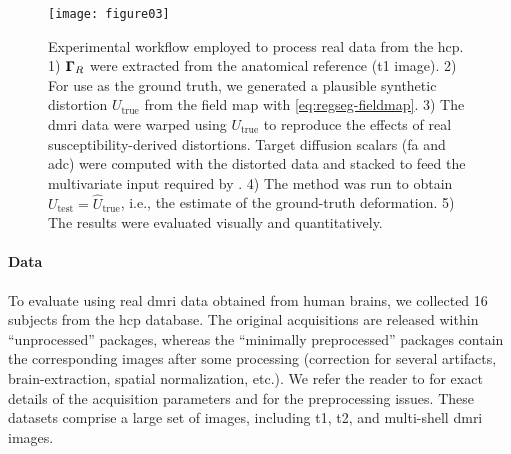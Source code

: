 \begin{figure*}
\texttt{[image: figure03]}
\caption{Experimental workflow employed to process real data from the \acrfull*{hcp}.
  1) $\boldsymbol{\Gamma}_R$ were extracted from the anatomical reference (\gls*{t1} image).
  2) For use as the ground truth, we generated a plausible synthetic distortion $U_\text{true}$
    from the field map with \eqref{eq:regseg-fieldmap}.
  3) The \gls*{dmri} data were warped using $U_\text{true}$ to reproduce the effects of real
    susceptibility-derived distortions.
  Target diffusion scalars (\gls*{fa} and \gls*{adc}) were computed with the distorted data and
    stacked to feed the multivariate input required by \regseg{}.
  4) The method was run to obtain $U_\text{test} = \hat{U}_\text{true}$, i.e., the estimate of
    the ground-truth deformation.
  5) The results were evaluated visually and quantitatively.
  }\label{fig:regseg-evworkflows}
\end{figure*}


\paragraph*{Data}
To evaluate \regseg{} using real \gls*{dmri} data obtained from human brains,
  we collected 16 subjects from the \gls*{hcp} database.
The original acquisitions are released within ``unprocessed'' packages, whereas
  the ``minimally preprocessed'' packages contain the corresponding images after
  some processing (correction for several artifacts, brain-extraction, spatial
  normalization, etc.).
We refer the reader to \citep{essen_human_2012} for exact details of the acquisition
  parameters and \citep{glasser_minimal_2013} for the preprocessing issues.
These datasets comprise a large set of images, including \gls*{t1}, \gls*{t2}, and
  multi-shell \gls*{dmri} images.

